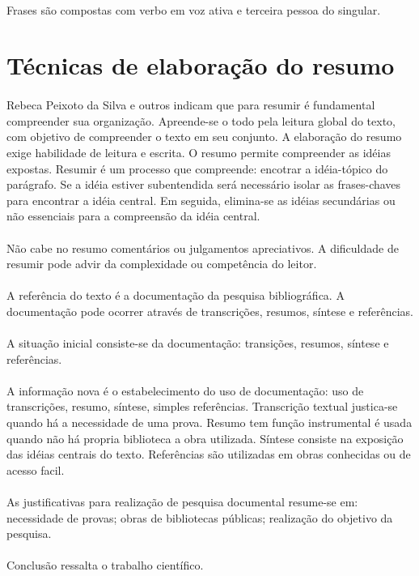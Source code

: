 \paragraph{}
Frases são compostas com verbo em voz ativa e terceira pessoa do singular.

\section{Técnicas de elaboração do resumo}

\paragraph{}
Rebeca Peixoto da Silva e outros indicam que para resumir é fundamental compreender sua organização. Apreende-se o todo pela leitura global do texto, com objetivo de compreender o texto em seu conjunto. A elaboração do resumo exige habilidade de leitura e escrita. O resumo permite compreender as idéias expostas. Resumir é um processo que compreende: encotrar a idéia-tópico do parágrafo. Se a idéia estiver subentendida será necessário isolar as frases-chaves para encontrar a idéia central. Em seguida, elimina-se as idéias secundárias ou não essenciais para a compreensão da idéia central.

\paragraph{}
Não cabe no resumo comentários ou julgamentos apreciativos. A dificuldade de resumir pode advir da complexidade ou competência do leitor.

\paragraph{}
A referência do texto é a documentação da pesquisa bibliográfica. A documentação pode ocorrer através de transcrições, resumos, síntese e referências. 

\paragraph{}
A situação inicial consiste-se da documentação: transições, resumos, síntese e referências. 

\paragraph{}
A informação nova é o estabelecimento do uso de documentação: uso de transcrições, resumo, síntese, simples referências. Transcrição textual justica-se quando há a necessidade de uma prova. Resumo tem função instrumental é usada quando não há propria biblioteca a obra utilizada. Síntese consiste na exposição das idéias centrais do texto. Referências são utilizadas em obras conhecidas ou de acesso facil.

\paragraph{}
As justificativas para realização de pesquisa documental resume-se em: necessidade de provas; obras de bibliotecas públicas; realização do objetivo da pesquisa.

\paragraph{}
Conclusão ressalta o trabalho científico.